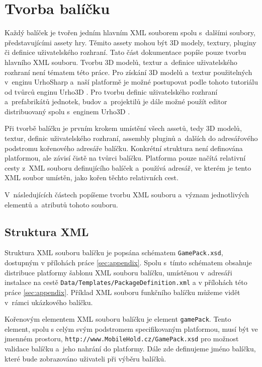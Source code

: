 \chapter{Tvorba balíčku}
\label{sec:packagemaking}
Každý balíček je tvořen jedním hlavním XML souborem spolu s~dalšími soubory, představujícími assety hry. Těmito assety mohou být 3D modely, textury, pluginy či definice uživatelského rozhraní. Tato část dokumentace popíše pouze tvorbu hlavního XML souboru. Tvorbu 3D modelů, textur a~definice uživatelského rozhraní není tématem této práce. Pro získání 3D modelů a~textur použitelných v~enginu UrhoSharp a~naší platformě je možné postupovat podle tohoto tutoriálu od tvůrců enginu Urho3D \citep{site:blendertourho3D}. Pro tvorbu definic uživatelského rozhraní a~prefabrikátů jednotek, budov a~projektilů je dále možné použít editor distribuovaný spolu s~enginem Urho3D \citep{site:urho3deditor}.

Při tvorbě balíčku je prvním krokem umístění všech assetů, tedy 3D modelů, textur, definic uživatelského rozhraní, assembly pluginů a~dalších do adresářového podstromu kořenového adresáře balíčku. Konkrétní struktura není definována platformou, ale závisí čistě na tvůrci balíčku. Platforma pouze načítá relativní cesty z~XML souboru definujícího balíček a~používá adresář, ve kterém je tento XML soubor umístěn, jako kořen těchto relativních cest. 

V~následujících částech popíšeme tvorbu XML souboru a~význam jednotlivých elementů a~atributů tohoto souboru.


\section{Struktura XML}
Struktura XML souboru balíčku je popsána schématem \texttt{GamePack.xsd}, dostupným v přílohách práce \ref{sec:appendix}. Spolu s~tímto schématem obsahuje distribuce platformy šablonu XML souboru balíčku, umístěnou v~adresáři instalace na cestě \texttt{Data/Templates/PackageDefinition.xml} a v přílohách této práce \ref{sec:appendix}. Příklad XML souboru funkčního balíčku můžeme vidět v~rámci ukázkového balíčku. 

Kořenovým elementem XML souboru balíčku je element \texttt{gamePack}. Tento element, spolu s celým svým podstromem specifikovaným platformou, musí být ve jmenném prostoru, \texttt{http://www.MobileHold.cz/GamePack.xsd} pro možnost validace balíčku a~jeho nahrání do platformy. Dále zde  definujeme jméno balíčku, které bude zobrazováno uživateli při výběru balíčků. 

